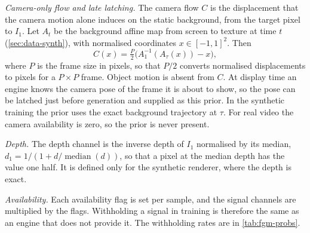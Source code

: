 \emph{Camera-only flow and late latching.} The camera flow $C$ is the displacement that the camera motion alone induces on the static background, from the target pixel to $I_1$. Let $A_t$ be the background affine map from screen to texture at time $t$ (\cref{sec:data-synth}), with normalised coordinates $x\in[-1,1]^2$. Then
\begin{equation}
C(x)=\tfrac{P}{2}\big(A_1^{-1}(A_\tau(x))-x\big),
\end{equation}
where $P$ is the frame size in pixels, so that $P/2$ converts normalised displacements to pixels for a $P\times P$ frame. Object motion is absent from $C$. At display time an engine knows the camera pose of the frame it is about to show, so the pose can be latched just before generation and supplied as this prior. In the synthetic training the prior uses the exact background trajectory at $\tau$. For real video the camera availability is zero, so the prior is never present.

\emph{Depth.} The depth channel is the inverse depth of $I_1$ normalised by its median, $d_1=1/(1+d/\operatorname{median}(d))$, so that a pixel at the median depth has the value one half. It is defined only for the synthetic renderer, where the depth is exact.

\emph{Availability.} Each availability flag is set per sample, and the signal channels are multiplied by the flags. Withholding a signal in training is therefore the same as an engine that does not provide it. The withholding rates are in \cref{tab:fgm-probs}.

